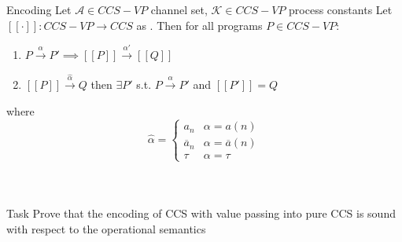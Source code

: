 \documentclass[aspectratio=169, 10pt]{beamer}
\begin{document}
\begin{frame}
  \centering
  \begin{block}{\centering Encoding}
    Let \(\mathcal{A} \in CCS-VP\) channel set, \(\mathcal{K} \in CCS-VP\) process constants
    Let \([\![\cdot]\!]: CCS-VP \rightarrow CCS\) as .
    Then for all programs \(P \in CCS-VP\):
    \begin{enumerate}
      \item \(P \xrightarrow{\alpha} P' \implies [\![ P ]\!] \xrightarrow{\alpha'} [\![ Q ]\!]\)
      \item \([\![ P ]\!] \xrightarrow{\hat{\alpha}} Q\) then \(\exists P'\) s.t. \(P \xrightarrow{\alpha} P'\) and \([\![ P' ]\!] = Q\)
    \end {enumerate}
    where\[\hat{\alpha} = \begin{cases}a_n &  \alpha = a(n) \\ \overline{a}_n & \alpha = \overline{a}(n) \\ \tau & \alpha = \tau\end{cases}\]
  \end{block}\hfill\\
  
\end{frame}

\begin{frame}
  \frametitle{}
  \begin{block}{\centering Task}
    \centering
    Prove that the encoding of CCS with value passing into pure CCS is sound with respect to the operational semantics
  \end{block}
\end{frame}
\end{document}
